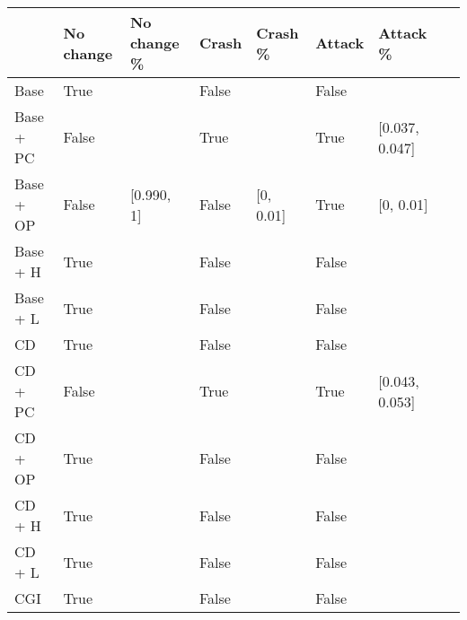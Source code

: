 \begin{table}
    \begin{tabular}{l|l|l|l|l|l|l|l}
    ~         & No change & No change \% & Crash & Crash \% & Attack & Attack \% \\ \hline
    Base      & True &\relax[0.990, 1] & False & \relax[0, 0.01] & False & \relax[0, 0.01] ~                                                                                    & ~ \\
    Base + PC & False & \relax[0.768, 0.778] & True & \relax[0.180, 0.190] & True & [0.037, 0.047]                                                                                   & ~ \\
    Base + OP & False & [0.990, 1] & False & [0, 0.01] & True & [0, 0.01]                                                                                   & ~ \\
    Base + H  & True &\relax[0.990, 1] & False & \relax[0, 0.01] & False & \relax[0, 0.01]                                                                                    & ~ \\
    Base + L  & True &\relax[0.990, 1] & False & \relax[0, 0.01] & False & \relax[0, 0.01]                                                                                    & ~ \\
    CD        & True &\relax[0.990, 1] & False & \relax[0, 0.01] & False & \relax[0, 0.01]                                                                                    & ~ \\
    CD + PC   & False & \relax[0.765, 0.775] & True & \relax[0.177, 0.187] & True & [0.043, 0.053]                                                                                & ~ \\
    CD + OP   & True &\relax[0.990, 1] & False & \relax[0, 0.01] & False & \relax[0, 0.01]                                                                                   & ~ \\
    CD + H    & True &\relax[0.990, 1] & False & \relax[0, 0.01] & False & \relax[0, 0.01]                                                                                    & ~ \\
    CD + L    & True &\relax[0.990, 1] & False & \relax[0, 0.01] & False & \relax[0, 0.01]                                                                                    & ~ \\
    CGI       & True &\relax[0.990, 1] & False & \relax[0, 0.01] & False & \relax[0, 0.01]                                                                                     & ~ \\

\end{tabular}
\end{table}
